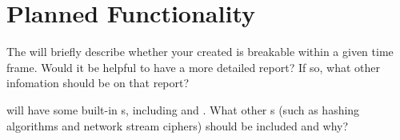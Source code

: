 \section{Planned Functionality}

\begin{question}
The \cry{} \cf{} will briefly describe whether your created
\ca{} is breakable within a given time frame.
Would it be helpful to have a more detailed report?
If so, what other infomation should be on that report?
\end{question}

\begin{question}
\cry{} will have some built-in \ca s,
including \rsa{} and \eg.
What other \ca s
(such as hashing algorithms and network stream ciphers)
should be included and why?
\end{question}
